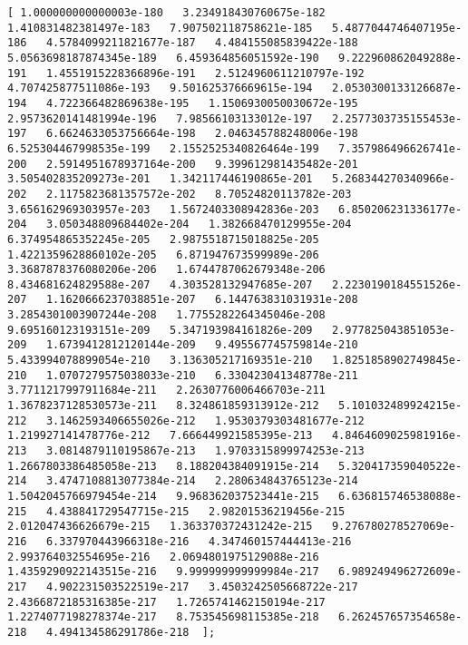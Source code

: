 \documentclass[11pt]{article}
\begin{document}
\begin{Verbatim}[commandchars=\\\{\}]
[ 1.000000000000003e-180   3.234918430760675e-182   1.410831482381497e-183   7.907502118758621e-185   5.4877044746407195e-186   4.5784099211821677e-187   4.484155085839422e-188   5.0563698187874345e-189   6.459364856051592e-190   9.222960862049288e-191   1.4551915228366896e-191   2.5124960611210797e-192   4.707425877511086e-193   9.501625376669615e-194   2.0530300133126687e-194   4.722366482869638e-195   1.1506930050030672e-195   2.9573620141481994e-196   7.98566103133012e-197   2.2577303735155453e-197   6.6624633053756664e-198   2.046345788248006e-198   6.525304467998535e-199   2.1552525340826464e-199   7.357986496626741e-200   2.5914951678937164e-200   9.399612981435482e-201   3.505402835209273e-201   1.342117446190865e-201   5.268344270340966e-202   2.1175823681357572e-202   8.70524820113782e-203   3.656162969303957e-203   1.5672403308942836e-203   6.850206231336177e-204   3.050348809684402e-204   1.382668470129955e-204   6.374954865352245e-205   2.9875518715018825e-205   1.4221359628860102e-205   6.871947673599989e-206   3.3687878376080206e-206   1.6744787062679348e-206   8.434681624829588e-207   4.303528132947685e-207   2.2230190184551526e-207   1.1620666237038851e-207   6.144763831031931e-208   3.2854301003907244e-208   1.7755282264345046e-208   9.695160123193151e-209   5.347193984161826e-209   2.977825043851053e-209   1.6739412812120144e-209   9.495567745759814e-210   5.433994078899054e-210   3.136305217169351e-210   1.8251858902749845e-210   1.0707279575038033e-210   6.330423041348778e-211   3.7711217997911684e-211   2.2630776006466703e-211   1.3678237128530573e-211   8.324861859313912e-212   5.101032489924215e-212   3.1462593406655026e-212   1.9530379303481677e-212   1.219927141478776e-212   7.666449921585395e-213   4.8464609025981916e-213   3.0814879110195867e-213   1.9703315899974253e-213   1.2667803386485058e-213   8.188204384091915e-214   5.320417359040522e-214   3.4747108813077384e-214   2.280634843765123e-214   1.5042045766979454e-214   9.968362037523441e-215   6.636815746538088e-215   4.438841729547715e-215   2.98201536219456e-215   2.012047436626679e-215   1.363370372431242e-215   9.276780278527069e-216   6.337970443966318e-216   4.347460157444413e-216   2.993764032554695e-216   2.0694801975129088e-216   1.4359290922143515e-216   9.999999999999984e-217   6.989249496272609e-217   4.902231503522519e-217   3.4503242505668722e-217   2.4366872185316385e-217   1.7265741462150194e-217   1.2274077198278374e-217   8.753545698115385e-218   6.262457657354658e-218   4.494134586291786e-218  ];

\end{Verbatim}
\end{document}
